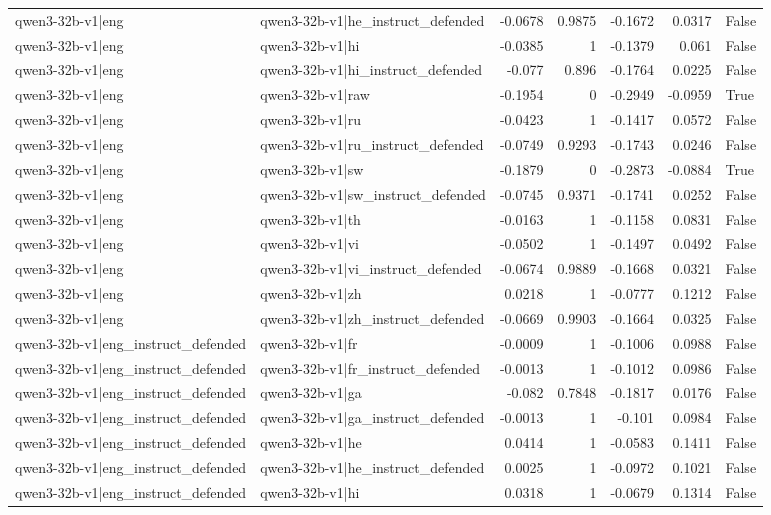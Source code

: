 \begin{table}
\begin{tabular}{l l r r r r l}
qwen3-32b-v1|eng & qwen3-32b-v1|he_instruct_defended & -0.0678 & 0.9875 & -0.1672 & 0.0317 & False \\
qwen3-32b-v1|eng & qwen3-32b-v1|hi & -0.0385 & 1 & -0.1379 & 0.061 & False \\
qwen3-32b-v1|eng & qwen3-32b-v1|hi_instruct_defended & -0.077 & 0.896 & -0.1764 & 0.0225 & False \\
qwen3-32b-v1|eng & qwen3-32b-v1|raw & -0.1954 & 0 & -0.2949 & -0.0959 & True \\
qwen3-32b-v1|eng & qwen3-32b-v1|ru & -0.0423 & 1 & -0.1417 & 0.0572 & False \\
qwen3-32b-v1|eng & qwen3-32b-v1|ru_instruct_defended & -0.0749 & 0.9293 & -0.1743 & 0.0246 & False \\
qwen3-32b-v1|eng & qwen3-32b-v1|sw & -0.1879 & 0 & -0.2873 & -0.0884 & True \\
qwen3-32b-v1|eng & qwen3-32b-v1|sw_instruct_defended & -0.0745 & 0.9371 & -0.1741 & 0.0252 & False \\
qwen3-32b-v1|eng & qwen3-32b-v1|th & -0.0163 & 1 & -0.1158 & 0.0831 & False \\
qwen3-32b-v1|eng & qwen3-32b-v1|vi & -0.0502 & 1 & -0.1497 & 0.0492 & False \\
qwen3-32b-v1|eng & qwen3-32b-v1|vi_instruct_defended & -0.0674 & 0.9889 & -0.1668 & 0.0321 & False \\
qwen3-32b-v1|eng & qwen3-32b-v1|zh & 0.0218 & 1 & -0.0777 & 0.1212 & False \\
qwen3-32b-v1|eng & qwen3-32b-v1|zh_instruct_defended & -0.0669 & 0.9903 & -0.1664 & 0.0325 & False \\
qwen3-32b-v1|eng_instruct_defended & qwen3-32b-v1|fr & -0.0009 & 1 & -0.1006 & 0.0988 & False \\
qwen3-32b-v1|eng_instruct_defended & qwen3-32b-v1|fr_instruct_defended & -0.0013 & 1 & -0.1012 & 0.0986 & False \\
qwen3-32b-v1|eng_instruct_defended & qwen3-32b-v1|ga & -0.082 & 0.7848 & -0.1817 & 0.0176 & False \\
qwen3-32b-v1|eng_instruct_defended & qwen3-32b-v1|ga_instruct_defended & -0.0013 & 1 & -0.101 & 0.0984 & False \\
qwen3-32b-v1|eng_instruct_defended & qwen3-32b-v1|he & 0.0414 & 1 & -0.0583 & 0.1411 & False \\
qwen3-32b-v1|eng_instruct_defended & qwen3-32b-v1|he_instruct_defended & 0.0025 & 1 & -0.0972 & 0.1021 & False \\
qwen3-32b-v1|eng_instruct_defended & qwen3-32b-v1|hi & 0.0318 & 1 & -0.0679 & 0.1314 & False \\

\end{tabular}
\end{table}
